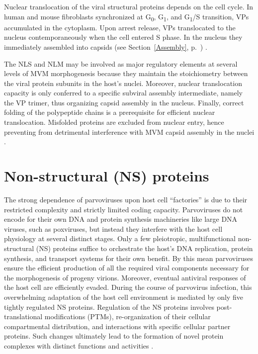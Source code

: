 Nuclear translocation of the viral structural proteins depends on the cell cycle. In human and mouse fibroblasts synchronized at G\textsubscript{0}, G\textsubscript{1}, and G\textsubscript{1}/S transition, VPs accumulated in the cytoplasm. Upon arrest release, VPs translocated to the nucleus contemporaneously when the cell entered S phase. In the nucleus they immediately assembled into capsids (see Section~\ref{Assembly}, p.~\pageref{Assembly}) \cite{pmid26067441}.


The NLS and NLM may be involved as major regulatory elements at several levels of MVM morphogenesis because they maintain the stoichiometry between the viral protein subunits in the host's nuclei. Moreover, nuclear translocation capacity is only conferred to a specific subviral assembly intermediate, namely the VP trimer, thus organizing capsid assembly in the nucleus. Finally, correct folding of the polypeptide chains is a prerequisite for efficient nuclear translocation. Misfolded proteins are excluded from nuclear entry, hence preventing from detrimental interference with MVM capsid assembly in the nuclei \cite{pmid10729155}.

                

\section{Non-structural (NS) proteins}
\label{NS}

The strong dependence of parvoviruses upon host cell “factories” is due to their restricted complexity and strictly limited coding capacity. Parvoviruses do not encode for their own DNA and protein synthesis machineries like large DNA viruses, such as poxviruses, but instead they interfere with the host cell physiology at several distinct stages. Only a few pleiotropic, multifunctional non-structural (NS) proteins suffice to orchestrate the host’s DNA replication, protein synthesis, and transport systems for their own benefit. By this mean parvoviruses ensure the efficient production of all the required viral components necessary for the morphogenesis of progeny virions. Moreover, eventual antiviral responses of the host cell are efficiently evaded. During the course of parvovirus infection, this overwhelming adaptation of the host cell environment is mediated by only five tightly regulated NS proteins. Regulation of the NS proteins involves post-translational modifications (PTMs), re-organization of their cellular compartmental distribution, and interactions with specific cellular partner proteins. Such changes ultimately lead to the formation of novel protein complexes with distinct functions and activities \cite{NS}.        


